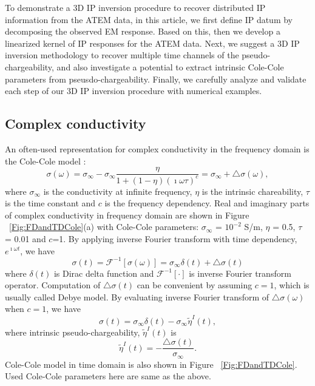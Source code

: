 \documentclass[a4paper, 11pt]{article}
\newcommand{\siginf}{\sigma_\infty}
\newcommand{\dsig}{\triangle\sigma}
\newcommand{\peta}{\tilde{\eta}}
\begin{document}
To demonstrate a 3D IP inversion procedure to recover distributed IP information from the ATEM data, in this article, we first define IP datum by decomposing the observed EM response. 
Based on this, then we develop a linearized kernel of IP responses for the ATEM data. 
Next, we suggest a 3D IP inversion methodology to recover multiple time channels of the pseudo-chargeability, and also investigate a potential to extract intrinsic Cole-Cole parameters from pseusdo-chargeability. Finally, we carefully analyze and validate each step of our 3D IP inversion procedure with numerical examples. 
      
    

\subsection{Complex conductivity}
An often-used representation for complex conductivity in the frequency domain is the Cole-Cole model \cite{COLE}:
\begin{equation}
  \sigma(\omega) = \sigma_{\infty} - \sigma_{\infty}\frac{\eta}{1+(1-\eta)(\imath\omega\tau)^c} = \sigma_{\infty} + \triangle\sigma(\omega),
  \label{eq: sigma_freq}
\end{equation}
where $\sigma_{\infty}$ is the conductivity at infinite frequency, $\eta$ is the intrinsic chareability, $\tau$ is the time constant and $c$ is the frequency dependency. Real and imaginary parts of complex conductivity in frequency domain are shown in Figure ~\ref{Fig:FDandTDCole}(a) with Cole-Cole parameters: $\siginf$ = $10^{-2}$ S/m, $\eta $ = 0.5, $\tau$ = 0.01 and $c$=1. By applying inverse Fourier transform with time dependency, $e^{\imath\omega t}$, we have
\begin{equation}
  \sigma(t) = \mathscr{F}^{-1}[\sigma(\omega)] = \sigma_{\infty}\delta(t) + \triangle\sigma(t)
  \label{eq: sigma_time}
\end{equation}
where $\delta(t)$ is Dirac delta function and $\mathscr{F}^{-1}[\cdot]$ is inverse Fourier transform operator. Computation of $\triangle\sigma(t)$ can be convenient by assuming $c=1$, which is usually called Debye model. By evaluating inverse Fourier transform of $\triangle\sigma(\omega)$ when $c=1$, we have
\begin{equation}
  \sigma(t) = \sigma_{\infty}\delta(t) - \siginf\peta^{I}(t),
  \label{eq: sigma_time_c1}
\end{equation}
where intrinsic pseudo-chargeability, $\peta^{I}(t)$ is
\begin{equation}
    \peta^{I}(t) = -\frac{\dsig(t)}{\siginf}. %
    \label{eq: intrinsic_peta}
\end{equation}
Cole-Cole model in time domain is also shown in Figure ~\ref{Fig:FDandTDCole}. Used Cole-Cole parameters here are same as the above.
\end{document}
